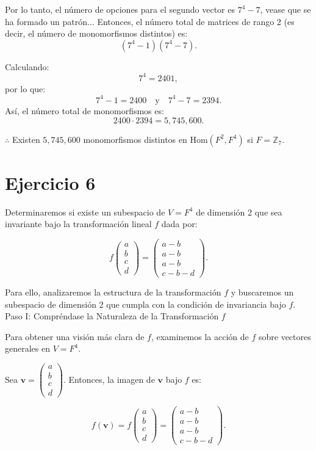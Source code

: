 \documentclass{article}
\begin{document}
Por lo tanto, el número de opciones para el segundo vector es \( 7^4 - 7 \), vease que se ha formado un patrón... Entonces, el número total de matrices de rango 2 (es decir, el número de monomorfismos distintos) es:
\[
(7^4 - 1)(7^4 - 7).
\]

Calculando:
\[
7^4 = 2401,
\]
por lo que:
\[
7^4 - 1 = 2400 \quad \text{y} \quad 7^4 - 7 = 2394.
\]
Así, el número total de monomorfismos es:
\[
2400 \cdot 2394 = 5,745,600.
\]

$\therefore$ Existen \( 5,745,600 \) monomorfismos distintos en \( \text{Hom}(F^2, F^4) \) si \( F = \mathbb{Z}_7 \).




\section*{Ejercicio 6}

Determinaremos si existe un subespacio de \( V = F^4 \) de dimensión 2 que sea invariante bajo la transformación lineal \( f \) dada por:

\[
f \begin{pmatrix} a \\ b \\ c \\ d \end{pmatrix} = \begin{pmatrix} a - b \\ a - b \\ a - b \\ c - b - d \end{pmatrix}.
\]

Para ello, analizaremos la estructura de la transformación \( f \) y buscaremos un subespacio de dimensión 2 que cumpla con la condición de invariancia bajo \( f \).\\


Paso I: Compréndase la Naturaleza de la Transformación \( f \)

Para obtener una visión más clara de \( f \), examinemos la acción de \( f \) sobre vectores generales en \( V = F^4 \).

Sea \( \mathbf{v} = \begin{pmatrix} a \\ b \\ c \\ d \end{pmatrix} \). Entonces, la imagen de \( \mathbf{v} \) bajo \( f \) es:

\[
f(\mathbf{v}) = f \begin{pmatrix} a \\ b \\ c \\ d \end{pmatrix} = \begin{pmatrix} a - b \\ a - b \\ a - b \\ c - b - d \end{pmatrix}.
\]
\end{document}
